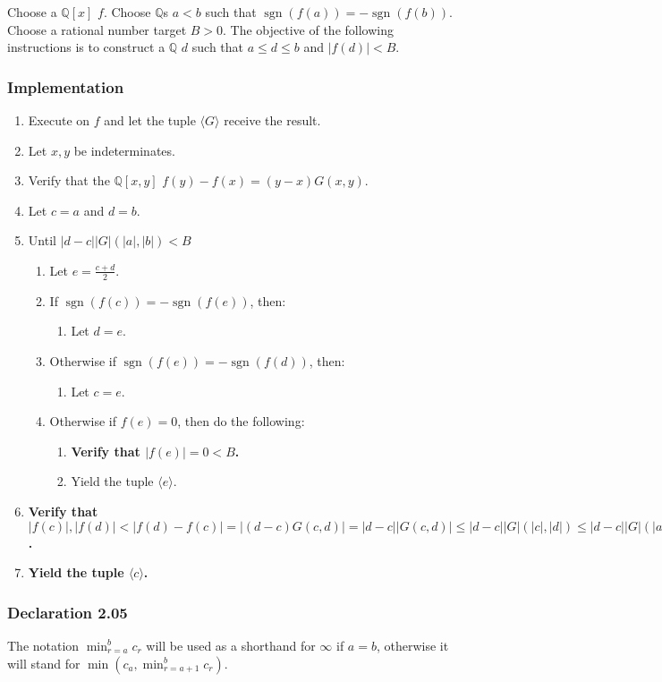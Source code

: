 \documentclass[twocolumn]{article}
\DeclareMathOperator{\sgn}{sgn}
\newcommand{\declaration}[1]{\subsubsection*{Declaration #1}\label{sec:declaration #1}}
\newcommand{\implementation}{\subsubsection*{Implementation}}
\newcommand{\procedurehr}[2][]{\hyperref[sec:procedure #2]{\ifthenelse{\equal{#1}{}}{procedure #2}{#1}}}
\begin{document}
				Choose a $\mathbb{Q}[x]$ $f$. Choose $\mathbb{Q}$s $a<b$ such that $\sgn(f(a))=-\sgn(f(b))$. Choose a rational number target $B>0$. The objective of the following instructions is to construct a $\mathbb{Q}$ $d$ such that $a\le d\le b$ and $\lvert f(d)\rvert<B$.
			\implementation
				\begin{enumerate}
					\item Execute \procedurehr{2.12} on $f$ and let the tuple $\langle G\rangle$ receive the result.
					\item Let $x,y$ be indeterminates.
					\item Verify that the $\mathbb{Q}[x,y]$ $f(y)-f(x)=(y-x)G(x,y)$.
					\item Let $c=a$ and $d=b$.
					\item Until $\lvert d-c\rvert \lvert G\rvert(\lvert a\rvert,\lvert b\rvert)<B$
					\begin{enumerate}
						\item Let $e=\frac{c+d}{2}$.
						\item If $\sgn(f(c))=-\sgn(f(e))$, then:
						\begin{enumerate}
							\item Let $d=e$.
						\end{enumerate}
						\item Otherwise if $\sgn(f(e))=-\sgn(f(d))$, then:
						\begin{enumerate}
							\item Let $c=e$.
						\end{enumerate}
						\item Otherwise if $f(e)=0$, then do the following:
						\begin{enumerate}
							\item \textbf{Verify that $\lvert f(e)\rvert=0<B$.}
							\item Yield the tuple $\langle e\rangle$.
						\end{enumerate}
					\end{enumerate}
					\item \textbf{Verify that $\lvert f(c)\rvert,\lvert f(d)\rvert<\lvert f(d)-f(c)\rvert=\lvert(d-c)G(c,d)\rvert=\lvert d-c\rvert\lvert G(c,d)\rvert\le\lvert d-c\rvert\lvert G\rvert(\lvert c\rvert,\lvert d\rvert)\le\lvert d-c\rvert\lvert G\rvert(\lvert a\rvert,\lvert b\rvert)<B$.}
					\item \textbf{Yield the tuple $\langle c\rangle$.}
				\end{enumerate}
		\declaration{2.05}
			The notation $\min_{r=a}^b c_r$ will be used as a shorthand for $\infty$ if $a=b$, otherwise it will stand for $\min(c_a,\min_{r=a+1}^b c_r)$.
\end{document}
